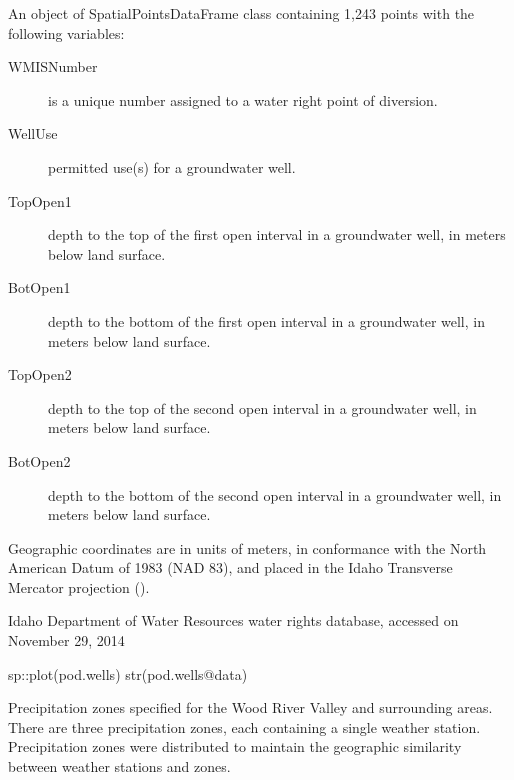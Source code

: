 \documentclass[a4paper]{book}
\begin{document}
\begin{Format}
An object of SpatialPointsDataFrame class containing 1,243 points
with the following variables:
\begin{description}

\item[WMISNumber] is a unique number assigned to a water right point of diversion.
\item[WellUse] permitted use(s) for a groundwater well.
\item[TopOpen1] depth to the top of the first open interval in a groundwater well,
in meters below land surface.
\item[BotOpen1] depth to the bottom of the first open interval in a groundwater well,
in meters below land surface.
\item[TopOpen2] depth to the top of the second open interval in a groundwater well,
in meters below land surface.
\item[BotOpen2] depth to the bottom of the second open interval in a groundwater well,
in meters below land surface.

\end{description}

Geographic coordinates are in units of meters, in conformance with the
North American Datum of 1983 (NAD 83), and placed in the
Idaho Transverse Mercator projection ().
\end{Format}
%
\begin{Source}\relax
Idaho Department of Water Resources water rights database,
accessed on November 29, 2014
\end{Source}
%
\begin{SeeAlso}\relax
{}
\end{SeeAlso}
%
\begin{Examples}
\begin{ExampleCode}
sp::plot(pod.wells)
str(pod.wells@data)

\end{ExampleCode}
\end{Examples}
%
\begin{Description}\relax
Precipitation zones specified for the Wood River Valley and surrounding areas.
There are three precipitation zones, each containing a single weather station.
Precipitation zones were distributed to maintain the geographic similarity between
weather stations and zones.
\end{Description}
\end{document}
